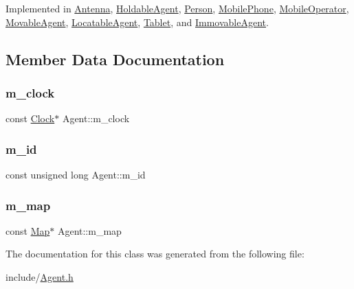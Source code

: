 Implemented in \mbox{\hyperlink{class_antenna_a7fea30e065f49a3cbcee02f60bd033c8}{Antenna}}, \mbox{\hyperlink{class_holdable_agent_a2c581226b8994f24b6b2306ae17dbb52}{Holdable\+Agent}}, \mbox{\hyperlink{class_person_a68872538da519d0a04297f43376db27c}{Person}}, \mbox{\hyperlink{class_mobile_phone_a2b7e556d12a43e380786ad0eccf3ce04}{Mobile\+Phone}}, \mbox{\hyperlink{class_mobile_operator_aa83724a149499ef10678ad651a5b40df}{Mobile\+Operator}}, \mbox{\hyperlink{class_movable_agent_a1dee2a6bf93f01006fadfb6fba6c9a59}{Movable\+Agent}}, \mbox{\hyperlink{class_locatable_agent_a88674f4c8ab9b1b2f3986b226bf4244f}{Locatable\+Agent}}, \mbox{\hyperlink{class_tablet_a3fae01e7d526699476221c6a686a4fba}{Tablet}}, and \mbox{\hyperlink{class_immovable_agent_a805b0d18035550d902d617a8c7ccc062}{Immovable\+Agent}}.



\subsection{Member Data Documentation}
\mbox{\label{class_agent_a534f22ebb0573aa1d58d274632e592cf}} 
\subsubsection{\texorpdfstring{m\_clock}{m\_clock}}
{\footnotesize\ttfamily const \mbox{\hyperlink{class_clock}{Clock}}$\ast$ Agent\+::m\+\_\+clock\hspace{0.3cm}{\ttfamily [private]}}

\mbox{\label{class_agent_ad1f52e164c2a829ef4418940567d6e37}} 
\subsubsection{\texorpdfstring{m\_id}{m\_id}}
{\footnotesize\ttfamily const unsigned long Agent\+::m\+\_\+id\hspace{0.3cm}{\ttfamily [private]}}

\mbox{\label{class_agent_ab24d62bbfc22946d0c72221c8a43f04a}} 
\subsubsection{\texorpdfstring{m\_map}{m\_map}}
{\footnotesize\ttfamily const \mbox{\hyperlink{class_map}{Map}}$\ast$ Agent\+::m\+\_\+map\hspace{0.3cm}{\ttfamily [private]}}



The documentation for this class was generated from the following file\+:\begin{DoxyCompactItemize}
\item 
include/\mbox{\hyperlink{_agent_8h}{Agent.\+h}}\end{DoxyCompactItemize}
